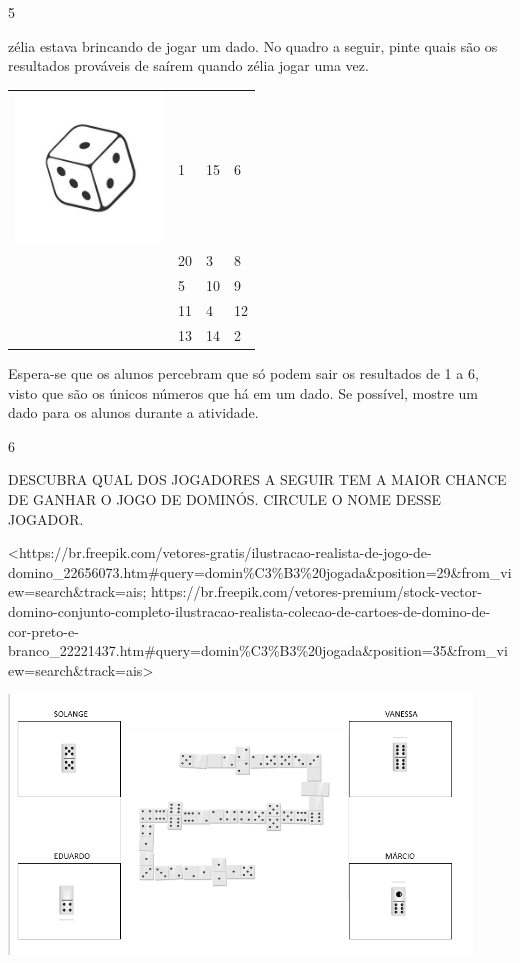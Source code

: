 \num{5}

zélia estava brincando de jogar um dado. No quadro a seguir, pinte quais são
os resultados prováveis de saírem quando zélia jogar uma vez.

\begin{longtable}[]{@{}llll@{}}
\toprule
\includegraphics[width=1.55208in,height=1.55208in]{media/image86.jpg} &
1 & 15 & 6\tabularnewline
& 20 & 3 & 8\tabularnewline
& 5 & 10 & 9\tabularnewline
& 11 & 4 & 12\tabularnewline
& 13 & 14 & 2\tabularnewline
\bottomrule
\end{longtable}

Espera-se que os alunos percebram que só podem sair os
resultados de 1 a 6, visto que são os únicos números que há em um
dado. Se possível, mostre um dado para os alunos durante a
atividade.

\num{6}

DESCUBRA QUAL DOS JOGADORES A SEGUIR TEM A MAIOR CHANCE DE GANHAR O JOGO
DE DOMINÓS. CIRCULE O NOME DESSE JOGADOR.

\textless{}https://br.freepik.com/vetores-gratis/ilustracao-realista-de-jogo-de-domino\_22656073.htm\#query=domin\%C3\%B3\%20jogada\&position=29\&from\_view=search\&track=ais;
https://br.freepik.com/vetores-premium/stock-vector-domino-conjunto-completo-ilustracao-realista-colecao-de-cartoes-de-domino-de-cor-preto-e-branco\_22221437.htm\#query=domin\%C3\%B3\%20jogada\&position=35\&from\_view=search\&track=ais\textgreater{}

\includegraphics[width=4.84499in,height=2.71476in]{media/image87.png}

